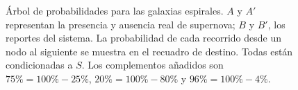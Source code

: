 \begin{figure}[H]
\shorthandon{<>}
\caption{Árbol de probabilidades para las galaxias espirales. $A$ y $A'$ representan la presencia y ausencia real de supernova; $B$ y $B'$, los reportes del sistema. La probabilidad de cada recorrido desde un nodo al siguiente se muestra en el recuadro de destino. Todas están condicionadas a $S$. Los complementos añadidos son $75\%=100\%-25\%$, $20\%=100\%-80\%$ y $96\%=100\%-4\%$.}
\label{fig:arbol-espirales}
\end{figure}